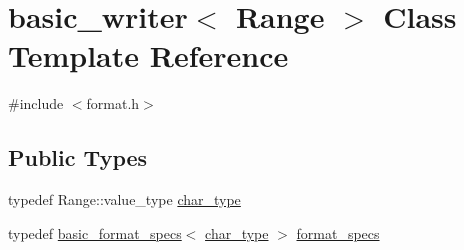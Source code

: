\hypertarget{classbasic__writer}{}\section{basic\+\_\+writer$<$ Range $>$ Class Template Reference}
\label{classbasic__writer}


{\ttfamily \#include $<$format.\+h$>$}

\subsection*{Public Types}
\begin{DoxyCompactItemize}
\item 
typedef Range\+::value\+\_\+type \hyperlink{classbasic__writer_ad6f1b4f79aa917bb28c4f4a37fabf0b7}{char\+\_\+type}
\item 
typedef \hyperlink{structbasic__format__specs}{basic\+\_\+format\+\_\+specs}$<$ \hyperlink{classbasic__writer_ad6f1b4f79aa917bb28c4f4a37fabf0b7}{char\+\_\+type} $>$ \hyperlink{classbasic__writer_ad0e2925cf7d02e0ccb6da44c06d64e55}{format\+\_\+specs}
\end{DoxyCompactItemize}
